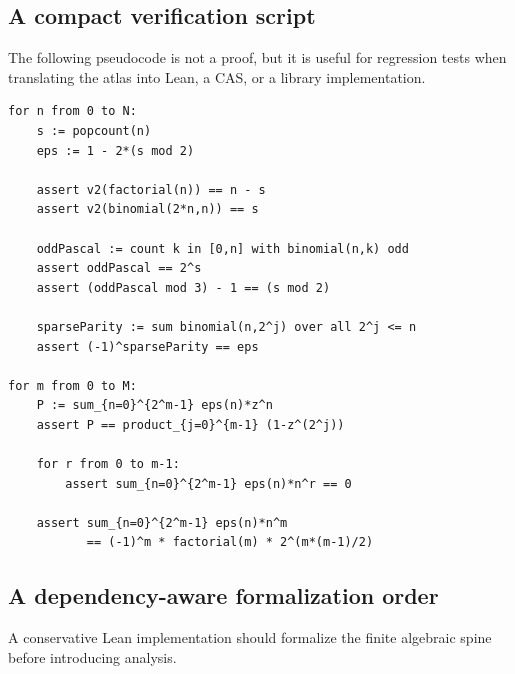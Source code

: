 \documentclass[11pt,oneside]{article}
\numberwithin{equation}{section}
\theoremstyle{definition}
\theoremstyle{remark}
\begin{document}
\subsection{A compact verification script}

The following pseudocode is not a proof, but it is useful for regression tests
when translating the atlas into Lean, a CAS, or a library implementation.

\begin{lstlisting}[style=pseudo]
for n from 0 to N:
    s := popcount(n)
    eps := 1 - 2*(s mod 2)

    assert v2(factorial(n)) == n - s
    assert v2(binomial(2*n,n)) == s

    oddPascal := count k in [0,n] with binomial(n,k) odd
    assert oddPascal == 2^s
    assert (oddPascal mod 3) - 1 == (s mod 2)

    sparseParity := sum binomial(n,2^j) over all 2^j <= n
    assert (-1)^sparseParity == eps

for m from 0 to M:
    P := sum_{n=0}^{2^m-1} eps(n)*z^n
    assert P == product_{j=0}^{m-1} (1-z^(2^j))

    for r from 0 to m-1:
        assert sum_{n=0}^{2^m-1} eps(n)*n^r == 0

    assert sum_{n=0}^{2^m-1} eps(n)*n^m
           == (-1)^m * factorial(m) * 2^(m*(m-1)/2)
\end{lstlisting}

\subsection{A dependency-aware formalization order}
\label{sec:formalization-order}

A conservative Lean implementation should formalize the finite algebraic
spine before introducing analysis.
\end{document}
